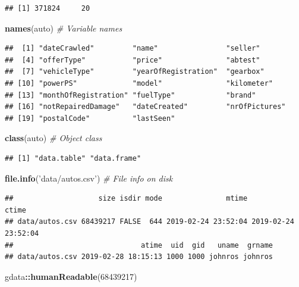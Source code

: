\documentclass[]{book}
\newenvironment{Shaded}{\begin{snugshade}}{\end{snugshade}}
\newcommand{\KeywordTok}[1]{\textcolor[rgb]{0.13,0.29,0.53}{\textbf{#1}}}
\newcommand{\DecValTok}[1]{\textcolor[rgb]{0.00,0.00,0.81}{#1}}
\newcommand{\StringTok}[1]{\textcolor[rgb]{0.31,0.60,0.02}{#1}}
\newcommand{\CommentTok}[1]{\textcolor[rgb]{0.56,0.35,0.01}{\textit{#1}}}
\newcommand{\OperatorTok}[1]{\textcolor[rgb]{0.81,0.36,0.00}{\textbf{#1}}}
\newcommand{\NormalTok}[1]{#1}
\theoremstyle{definition}
\theoremstyle{definition}
\theoremstyle{definition}
\theoremstyle{remark}
\begin{document}
\begin{verbatim}
## [1] 371824     20
\end{verbatim}

\begin{Shaded}
\begin{Highlighting}[]
\KeywordTok{names}\NormalTok{(auto) }\CommentTok{# Variable names}
\end{Highlighting}
\end{Shaded}

\begin{verbatim}
##  [1] "dateCrawled"         "name"                "seller"             
##  [4] "offerType"           "price"               "abtest"             
##  [7] "vehicleType"         "yearOfRegistration"  "gearbox"            
## [10] "powerPS"             "model"               "kilometer"          
## [13] "monthOfRegistration" "fuelType"            "brand"              
## [16] "notRepairedDamage"   "dateCreated"         "nrOfPictures"       
## [19] "postalCode"          "lastSeen"
\end{verbatim}

\begin{Shaded}
\begin{Highlighting}[]
\KeywordTok{class}\NormalTok{(auto) }\CommentTok{# Object class}
\end{Highlighting}
\end{Shaded}

\begin{verbatim}
## [1] "data.table" "data.frame"
\end{verbatim}

\begin{Shaded}
\begin{Highlighting}[]
\KeywordTok{file.info}\NormalTok{(}\StringTok{'data/autos.csv'}\NormalTok{) }\CommentTok{# File info on disk}
\end{Highlighting}
\end{Shaded}

\begin{verbatim}
##                    size isdir mode               mtime               ctime
## data/autos.csv 68439217 FALSE  644 2019-02-24 23:52:04 2019-02-24 23:52:04
##                              atime  uid  gid   uname  grname
## data/autos.csv 2019-02-28 18:15:13 1000 1000 johnros johnros
\end{verbatim}

\begin{Shaded}
\begin{Highlighting}[]
\NormalTok{gdata}\OperatorTok{::}\KeywordTok{humanReadable}\NormalTok{(}\DecValTok{68439217}\NormalTok{)}
\end{Highlighting}
\end{Shaded}
\end{document}
